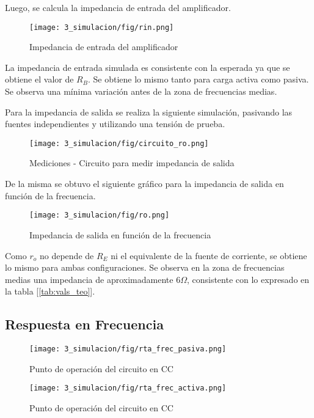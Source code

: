 Luego, se calcula la impedancia de entrada del amplificador.
\begin{figure}[H]
    \centering
    \texttt{[image: 3\_simulacion/fig/rin.png]}
    \label{mediciones_pol_activa}
    \caption{Impedancia de entrada del amplificador}
\end{figure}

La impedancia de entrada simulada es consistente con la esperada ya que se obtiene el valor de $R_B$. Se obtiene lo mismo 
tanto para carga activa como pasiva. Se observa una mínima variación antes de la zona de frecuencias medias. \par 


Para la impedancia de salida se realiza la siguiente simulación, pasivando las fuentes independientes 
y utilizando una tensión de prueba.

\begin{figure}[H]
    \centering
    \texttt{[image: 3\_simulacion/fig/circuito\_ro.png]}
    \label{mediciones_pol_activa}
    \caption{Mediciones - Circuito para medir impedancia de salida}
\end{figure}

De la misma se obtuvo el siguiente gráfico para la impedancia de salida en función de la frecuencia.

\begin{figure}[H]
    \centering
    \texttt{[image: 3\_simulacion/fig/ro.png]}
    \label{mediciones_pol_activa}
    \caption{Impedancia de salida en función de la frecuencia}
\end{figure}
Como $r_o$ no depende de $R_E$ ni el equivalente de la fuente de corriente, se obtiene lo mismo para ambas 
configuraciones. Se observa en la zona de frecuencias medias una impedancia de aproximadamente $6 \Omega$, 
consistente con lo expresado en la tabla [\ref{tab:vals_teo}].

\subsection{Respuesta en Frecuencia}
\begin{figure}[H]
    \centering
    \texttt{[image: 3\_simulacion/fig/rta\_frec\_pasiva.png]}
    \label{mediciones_pol_activa}
    \caption{Punto de operación del circuito en CC}
\end{figure}

\begin{figure}[H]
    \centering
    \texttt{[image: 3\_simulacion/fig/rta\_frec\_activa.png]}
    \label{mediciones_pol_activa}
    \caption{Punto de operación del circuito en CC}
\end{figure}


